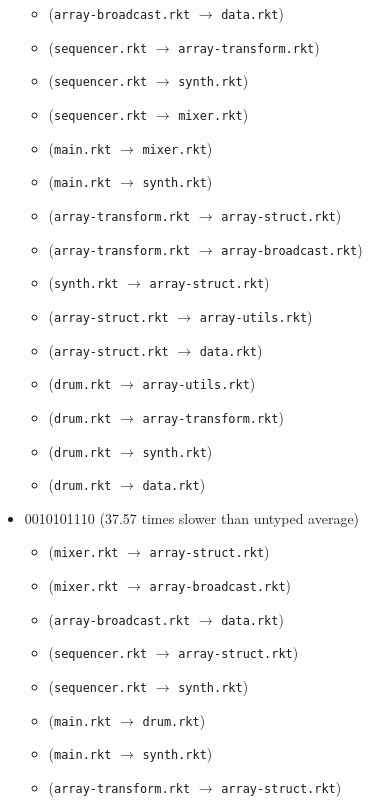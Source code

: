 \documentclass{article}
\newcommand{\mono}[1]{\texttt{#1}}
\begin{document}
\begin{itemize}
\begin{itemize}
  \item (\mono{array-broadcast.rkt} $\rightarrow$ \mono{data.rkt})
  \item (\mono{sequencer.rkt} $\rightarrow$ \mono{array-transform.rkt})
  \item (\mono{sequencer.rkt} $\rightarrow$ \mono{synth.rkt})
  \item (\mono{sequencer.rkt} $\rightarrow$ \mono{mixer.rkt})
  \item (\mono{main.rkt} $\rightarrow$ \mono{mixer.rkt})
  \item (\mono{main.rkt} $\rightarrow$ \mono{synth.rkt})
  \item (\mono{array-transform.rkt} $\rightarrow$ \mono{array-struct.rkt})
  \item (\mono{array-transform.rkt} $\rightarrow$ \mono{array-broadcast.rkt})
  \item (\mono{synth.rkt} $\rightarrow$ \mono{array-struct.rkt})
  \item (\mono{array-struct.rkt} $\rightarrow$ \mono{array-utils.rkt})
  \item (\mono{array-struct.rkt} $\rightarrow$ \mono{data.rkt})
  \item (\mono{drum.rkt} $\rightarrow$ \mono{array-utils.rkt})
  \item (\mono{drum.rkt} $\rightarrow$ \mono{array-transform.rkt})
  \item (\mono{drum.rkt} $\rightarrow$ \mono{synth.rkt})
  \item (\mono{drum.rkt} $\rightarrow$ \mono{data.rkt})
  \end{itemize}
\item 0010101110 (37.57 times slower than untyped average)
  \begin{itemize}
  \item (\mono{mixer.rkt} $\rightarrow$ \mono{array-struct.rkt})
  \item (\mono{mixer.rkt} $\rightarrow$ \mono{array-broadcast.rkt})
  \item (\mono{array-broadcast.rkt} $\rightarrow$ \mono{data.rkt})
  \item (\mono{sequencer.rkt} $\rightarrow$ \mono{array-struct.rkt})
  \item (\mono{sequencer.rkt} $\rightarrow$ \mono{synth.rkt})
  \item (\mono{main.rkt} $\rightarrow$ \mono{drum.rkt})
  \item (\mono{main.rkt} $\rightarrow$ \mono{synth.rkt})
  \item (\mono{array-transform.rkt} $\rightarrow$ \mono{array-struct.rkt})

\end{itemize}
\end{itemize}
\end{document}
